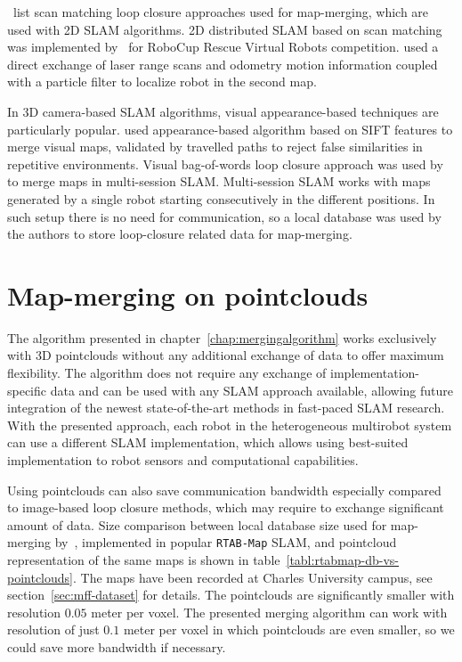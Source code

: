 \citet{lee2012survey}~list scan matching loop closure approaches used for map-merging, which are used with \gls{2D} \gls{SLAM} algorithms. \gls{2D} distributed \gls{SLAM} based on scan matching was implemented by~\citet{pfingsthorn2007scalable} for RoboCup Rescue Virtual Robots competition. \citet{fox2006distributed} used a direct exchange of laser range scans and odometry motion information coupled with a particle filter to localize robot in the second map.

In \gls{3D} camera-based \gls{SLAM} algorithms, visual appearance-based techniques are particularly popular. \citet{tomono2013merging} used appearance-based algorithm based on \gls{SIFT} features to merge visual maps, validated by travelled paths to reject false similarities in repetitive environments. Visual bag-of-words loop closure approach was used by~\citet{labbe2014online} to merge maps in multi-session \gls{SLAM}. Multi-session \gls{SLAM} works with maps generated by a single robot starting consecutively in the different positions. In such setup there is no need for communication, so a local database was used by the authors to store loop-closure related data for map-merging.

\section{Map-merging on pointclouds}
\label{sec:map-merging-on-pointclouds}

The algorithm presented in chapter~\ref{chap:mergingalgorithm} works exclusively with \gls{3D} pointclouds without any additional exchange of data to offer maximum flexibility. The algorithm does not require any exchange of implementation-specific data and can be used with any \gls{SLAM} approach available, allowing future integration of the newest state-of-the-art methods in fast-paced \gls{SLAM} research. With the presented approach, each robot in the heterogeneous multirobot system can use a different \gls{SLAM} implementation, which allows using best-suited implementation to robot sensors and computational capabilities.

Using pointclouds can also save communication bandwidth especially compared to image-based loop closure methods, which may require to exchange significant amount of data. Size comparison between local database size used for map-merging by~\citet{labbe2014online}, implemented in popular \texttt{RTAB-Map} \gls{SLAM}, and pointcloud representation of the same maps is shown in table~\ref{tabl:rtabmap-db-vs-pointclouds}. The maps have been recorded at Charles University campus, see section~\ref{sec:mff-dataset} for details. The pointclouds are significantly smaller with resolution $0.05$ meter per voxel. The presented merging algorithm can work with resolution of just $0.1$ meter per voxel in which pointclouds are even smaller, so we could save more bandwidth if necessary.

